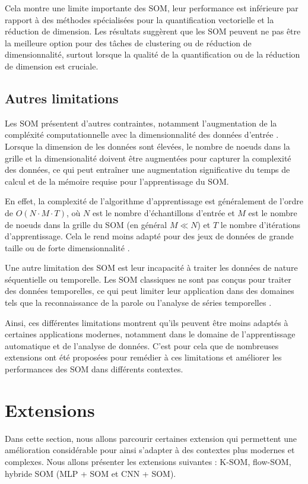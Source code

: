 \documentclass[12pt,a4paper]{report}
\begin{document}
Cela montre une limite importante des SOM, leur performance est inférieure par rapport à des méthodes spécialisées pour la quantification vectorielle et la réduction de dimension.
Les résultats suggèrent que les SOM peuvent ne pas être la meilleure option pour des tâches de clustering ou de réduction de dimensionnalité, surtout lorsque la qualité de la quantification ou de la réduction de dimension est cruciale.

\subsection{Autres limitations}

Les SOM présentent d'autres contraintes, notamment l'augmentation de la compléxité computationnelle avec la dimensionnalité des données d'entrée \cite{SurveySOM}.
Lorsque la dimension de les données sont élevées, le nombre de noeuds dans la grille et la dimensionalité doivent être augmentées pour capturer la complexité des données, ce qui peut entraîner une augmentation significative du temps de calcul 
et de la mémoire requise pour l'apprentissage du SOM.

En effet, la complexité de l'algorithme d'apprentissage est généralement de l'ordre de $O(N \cdot M \cdot T)$, où $N$ est le nombre d'échantillons d'entrée et $M$ est le nombre de noeuds dans la grille du SOM 
(en général $M \ll N$) et $T$ le nombre d'itérations d'apprentissage. Cela le rend moins adapté pour des jeux de données de grande taille ou de forte dimensionnalité \cite{SurveySOM}. 

Une autre limitation des SOM est leur incapacité à traiter les données de nature séquentielle ou temporelle. Les SOM classiques ne sont pas conçus pour traiter des données temporelles, 
ce qui peut limiter leur application dans des domaines tels que la reconnaissance de la parole ou l'analyse de séries temporelles \cite{SurveySOM}.

Ainsi, ces différentes limitations montrent qu'ils peuvent être moins adaptés à certaines applications modernes, notamment dans le domaine de l'apprentissage automatique et de l'analyse de données. 
C'est pour cela que de nombreuses extensions ont été proposées pour remédier à ces limitations et améliorer les performances des SOM dans différents contextes.

\section{Extensions}
Dans cette section, nous allons parcourir certaines extension qui permettent une amélioration considérable pour ainsi s'adapter à des contextes plus modernes et complexes.
Nous allons présenter les extensions suivantes : K-SOM, flow-SOM, hybride SOM (MLP + SOM et CNN + SOM).
\end{document}
